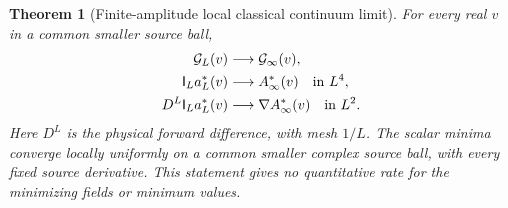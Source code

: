 \documentclass[11pt,oneside,openany]{book}
\newtheorem{theorem}{Theorem}[chapter]
\theoremstyle{definition}
\theoremstyle{remark}
\begin{document}
\begin{theorem}[Finite-amplitude local classical continuum limit]
\label{thm:classical-minimum-limit}
For every real $v$ in a common smaller source ball,
\begin{align}
 \mathcal G_L(v)&\longrightarrow\mathcal G_\infty(v),\notag\\
 \mathsf I_La_L^*(v)&\longrightarrow A_\infty^*(v)
                                          \quad\text{in }L^4,\notag\\
 D^L\mathsf I_La_L^*(v)&\longrightarrow\nabla A_\infty^*(v)
                                          \quad\text{in }L^2.
 \label{eq:classical-minimum-limit}
\end{align}
Here $D^L$ is the physical forward difference, with mesh $1/L$.
The scalar minima converge locally uniformly on a common smaller
complex source ball, with every fixed source derivative. This
statement gives no quantitative rate for the minimizing fields or
minimum values.
\end{theorem}
\end{document}
